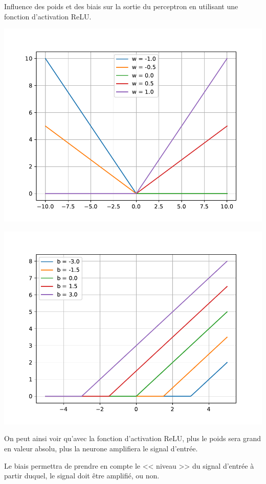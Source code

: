 \begin{rem}
Influence des poids et des biais sur la sortie du perceptron en utilisant une fonction d'activation ReLU.

\begin{minipage}[c]{.45\linewidth}
\begin{center}
\includegraphics[width=.9\linewidth]{images/poids}
\end{center}
\end{minipage}
\hfill
\begin{minipage}[c]{.45\linewidth}
\begin{center}
\includegraphics[width=.9\linewidth]{images/biais}
\end{center}
\end{minipage}

On peut ainsi voir qu'avec la fonction d'activation ReLU, plus le poids sera grand en valeur absolu, plus la neurone amplifiera le signal d'entrée. 

Le biais permettra de prendre en compte le << niveau >> du signal d'entrée à partir duquel, le signal doit être amplifié, ou non.

\end{rem}


